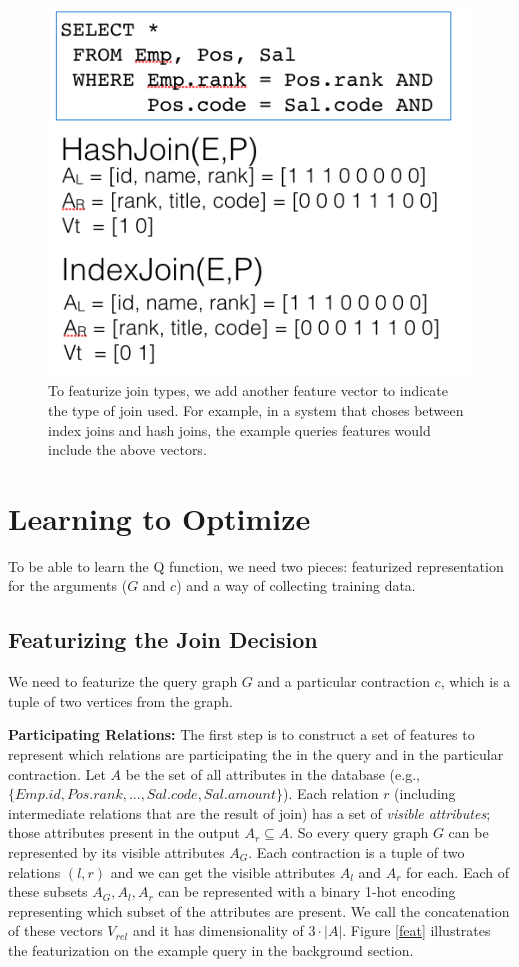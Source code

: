 \begin{figure}
    \centering
    \includegraphics[width=0.8\columnwidth]{figs/type.png}
    \caption{To featurize join types, we add another feature vector to indicate the type of join used. For example, in a system that choses between index joins and hash joins, the example queries features would include the above vectors.  \label{feat:type}}
\end{figure}

\section{Learning to Optimize}
To be able to learn the Q function, we need two pieces: featurized representation for the arguments ($G$ and $c$) and a way of collecting training data.

\subsection{Featurizing the Join Decision}
We need to featurize the query graph $G$ and a particular contraction $c$, which is a tuple of two vertices from the graph. 

\vspace{0.5em} \noindent \textbf{Participating Relations: } The first step is to construct a set of features to represent which relations are participating the in the query and in the particular contraction. Let $A$ be the set of all attributes in the database (e.g., $ \{Emp.id, Pos.rank,...,Sal.code,Sal.amount\}$). Each relation $r$ (including intermediate relations that are the result of join) has a set of \emph{visible attributes}; those attributes present in the output $A_r \subseteq A$. So every query graph $G$ can be represented by its visible attributes $A_G$. Each contraction is a tuple of two relations $(l,r)$ and we can get the visible attributes $A_l$ and $A_r$ for each. Each of these subsets $A_G, A_l, A_r$ can be represented with a binary 1-hot encoding representing which subset of the attributes are present. We call the concatenation of these vectors $V_{rel}$ and it has dimensionality of $3\cdot|A|$. Figure \ref{feat} illustrates the featurization on the example query in the background section. 

